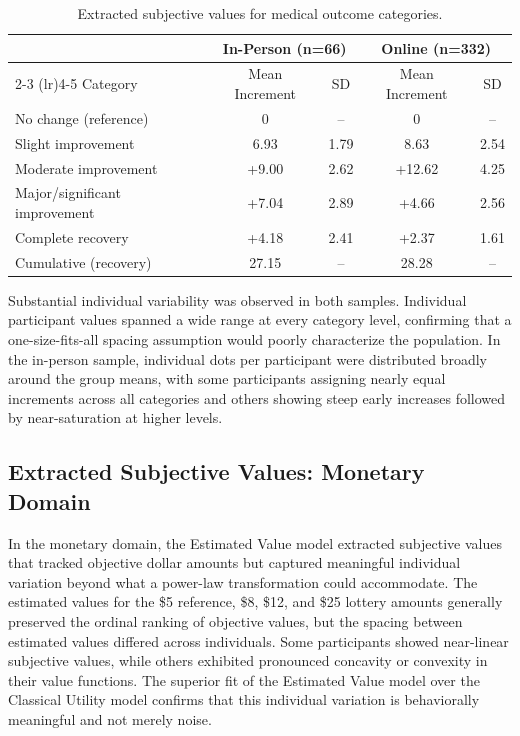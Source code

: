\documentclass[12pt]{article}
\begin{document}
\begin{table}[ht]
\centering
\caption{Extracted subjective values for medical outcome categories.}
\label{tab:medvalues}
\begin{tabular}{lcccc}
\toprule
 & \multicolumn{2}{c}{In-Person (n=66)} & \multicolumn{2}{c}{Online (n=332)} \\
\cmidrule(lr){2-3} \cmidrule(lr){4-5}
Category & Mean Increment & SD & Mean Increment & SD \\
\midrule
No change (reference) & 0 & -- & 0 & -- \\
Slight improvement & 6.93 & 1.79 & 8.63 & 2.54 \\
Moderate improvement & +9.00 & 2.62 & +12.62 & 4.25 \\
Major/significant improvement & +7.04 & 2.89 & +4.66 & 2.56 \\
Complete recovery & +4.18 & 2.41 & +2.37 & 1.61 \\
\midrule
Cumulative (recovery) & 27.15 & -- & 28.28 & -- \\
\bottomrule
\end{tabular}
\end{table}

Substantial individual variability was observed in both samples. Individual participant values spanned a wide range at every category level, confirming that a one-size-fits-all spacing assumption would poorly characterize the population. In the in-person sample, individual dots per participant were distributed broadly around the group means, with some participants assigning nearly equal increments across all categories and others showing steep early increases followed by near-saturation at higher levels.

\subsection{Extracted Subjective Values: Monetary Domain}

In the monetary domain, the Estimated Value model extracted subjective values that tracked objective dollar amounts but captured meaningful individual variation beyond what a power-law transformation could accommodate. The estimated values for the \$5 reference, \$8, \$12, and \$25 lottery amounts generally preserved the ordinal ranking of objective values, but the spacing between estimated values differed across individuals. Some participants showed near-linear subjective values, while others exhibited pronounced concavity or convexity in their value functions. The superior fit of the Estimated Value model over the Classical Utility model confirms that this individual variation is behaviorally meaningful and not merely noise.
\end{document}
